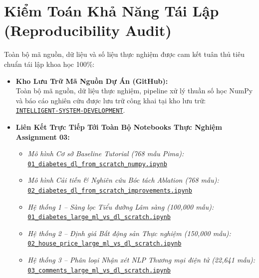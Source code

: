 \documentclass[12pt,a4paper]{report}
\begin{document}
\section{Kiểm Toán Khả Năng Tái Lập (Reproducibility Audit)}
Toàn bộ mã nguồn, dữ liệu và số liệu thực nghiệm được cam kết tuân thủ tiêu chuẩn tái lập khoa học 100\%:
\begin{itemize}[leftmargin=2em]
    \item \textbf{Kho Lưu Trữ Mã Nguồn Dự Án (GitHub):}\\Toàn bộ mã nguồn, dữ liệu thực nghiệm, pipeline xử lý thuần số học NumPy và báo cáo nghiên cứu được lưu trữ công khai tại kho lưu trữ:\\\href{https://github.com/phamtu2x5/INTELLIGENT-SYSTEM-DEVELOPMENT}{\texttt{INTELLIGENT-SYSTEM-DEVELOPMENT}}.
    \item \textbf{Liên Kết Trực Tiếp Tới Toàn Bộ Notebooks Thực Nghiệm Assignment 03:}
    \begin{itemize}
        \item \textit{Mô hình Cơ sở Baseline Tutorial (768 mẫu Pima):} \\\href{https://github.com/phamtu2x5/INTELLIGENT-SYSTEM-DEVELOPMENT/blob/main/src/Assigment%2003/diabetes/notebooks/01_diabetes_dl_from_scratch_numpy.ipynb}{\texttt{01\_diabetes\_dl\_from\_scratch\_numpy.ipynb}}
        \item \textit{Mô hình Cải tiến \& Nghiên cứu Bóc tách Ablation (768 mẫu):} \\\href{https://github.com/phamtu2x5/INTELLIGENT-SYSTEM-DEVELOPMENT/blob/main/src/Assigment%2003/diabetes/notebooks/02_diabetes_dl_from_scratch_improvements.ipynb}{\texttt{02\_diabetes\_dl\_from\_scratch\_improvements.ipynb}}
        \item \textit{Hệ thống 1 -- Sàng lọc Tiểu đường Lâm sàng (100,000 mẫu):} \\\href{https://github.com/phamtu2x5/INTELLIGENT-SYSTEM-DEVELOPMENT/blob/main/src/Assigment%2003/diabetes_large/notebooks/01_diabetes_large_ml_vs_dl_scratch.ipynb}{\texttt{01\_diabetes\_large\_ml\_vs\_dl\_scratch.ipynb}}
        \item \textit{Hệ thống 2 -- Định giá Bất động sản Thực nghiệm (150,000 mẫu):} \\\href{https://github.com/phamtu2x5/INTELLIGENT-SYSTEM-DEVELOPMENT/blob/main/src/Assigment%2003/house_price_large/notebooks/02_house_price_large_ml_vs_dl_scratch.ipynb}{\texttt{02\_house\_price\_large\_ml\_vs\_dl\_scratch.ipynb}}
        \item \textit{Hệ thống 3 -- Phân loại Nhận xét NLP Thương mại điện tử (22,641 mẫu):} \\\href{https://github.com/phamtu2x5/INTELLIGENT-SYSTEM-DEVELOPMENT/blob/main/src/Assigment%2003/customer_comments/notebooks/03_comments_large_ml_vs_dl_scratch.ipynb}{\texttt{03\_comments\_large\_ml\_vs\_dl\_scratch.ipynb}}

\end{itemize}
\end{itemize}
\end{document}
